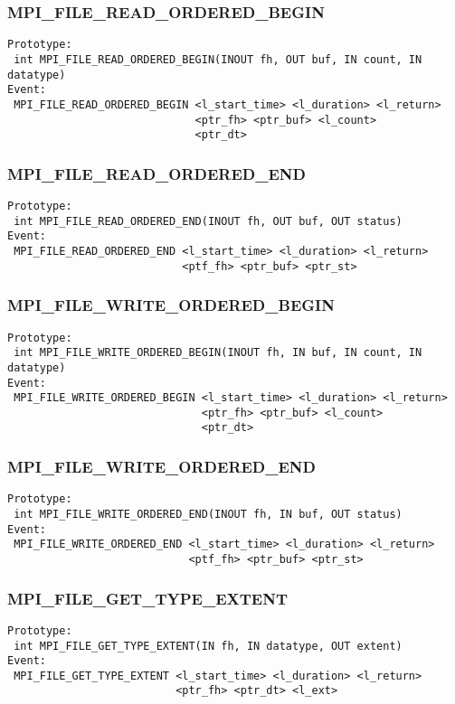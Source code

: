 \documentclass[9pt]{article}
\begin{document}
\subsubsection{MPI\_FILE\_READ\_ORDERED\_BEGIN}
\label{sec:MPIFILEREADORDEREDBEGIN}
\begin{verbatim}
Prototype:
 int MPI_FILE_READ_ORDERED_BEGIN(INOUT fh, OUT buf, IN count, IN datatype)
Event:
 MPI_FILE_READ_ORDERED_BEGIN <l_start_time> <l_duration> <l_return>
                             <ptr_fh> <ptr_buf> <l_count>
                             <ptr_dt>
\end{verbatim}

\subsubsection{MPI\_FILE\_READ\_ORDERED\_END}
\label{sec:MPIFILEREADORDEREDEND}
\begin{verbatim}
Prototype:
 int MPI_FILE_READ_ORDERED_END(INOUT fh, OUT buf, OUT status)
Event:
 MPI_FILE_READ_ORDERED_END <l_start_time> <l_duration> <l_return>
                           <ptf_fh> <ptr_buf> <ptr_st>
\end{verbatim}

\subsubsection{MPI\_FILE\_WRITE\_ORDERED\_BEGIN}
\label{sec:MPIFILEWRITEORDEREDBEGIN}
\begin{verbatim}
Prototype:
 int MPI_FILE_WRITE_ORDERED_BEGIN(INOUT fh, IN buf, IN count, IN datatype)
Event:
 MPI_FILE_WRITE_ORDERED_BEGIN <l_start_time> <l_duration> <l_return>
                              <ptr_fh> <ptr_buf> <l_count>
                              <ptr_dt>
\end{verbatim}

\subsubsection{MPI\_FILE\_WRITE\_ORDERED\_END}
\label{sec:MPIFILEWRITEORDEREDEND}
\begin{verbatim}
Prototype:
 int MPI_FILE_WRITE_ORDERED_END(INOUT fh, IN buf, OUT status)
Event:
 MPI_FILE_WRITE_ORDERED_END <l_start_time> <l_duration> <l_return>
                            <ptf_fh> <ptr_buf> <ptr_st>
\end{verbatim}

\subsubsection{MPI\_FILE\_GET\_TYPE\_EXTENT}
\label{sec:MPIFILEGETTYPEEXTENT}
\begin{verbatim}
Prototype:
 int MPI_FILE_GET_TYPE_EXTENT(IN fh, IN datatype, OUT extent)
Event:
 MPI_FILE_GET_TYPE_EXTENT <l_start_time> <l_duration> <l_return>
                          <ptr_fh> <ptr_dt> <l_ext>
\end{verbatim}
\end{document}
